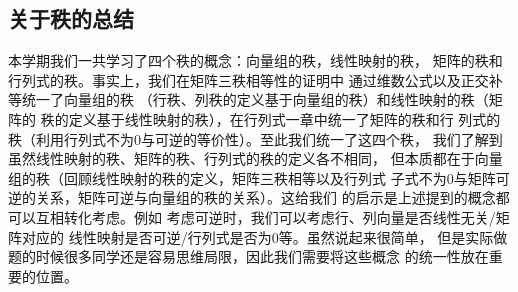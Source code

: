 \subsection{关于秩的总结}
本学期我们一共学习了四个秩的概念：向量组的秩，线性映射的秩，
矩阵的秩和行列式的秩。事实上，我们在矩阵三秩相等性的证明中
通过维数公式以及正交补等统一了向量组的秩
（行秩、列秩的定义基于向量组的秩）和线性映射的秩（矩阵的
秩的定义基于线性映射的秩），在行列式一章中统一了矩阵的秩和行
列式的秩（利用行列式不为0与可逆的等价性）。至此我们统一了这四个秩，
我们了解到虽然线性映射的秩、矩阵的秩、行列式的秩的定义各不相同，
但本质都在于向量组的秩（回顾线性映射的秩的定义，矩阵三秩相等以及行列式
子式不为0与矩阵可逆的关系，矩阵可逆与向量组的秩的关系）。这给我们
的启示是上述提到的概念都可以互相转化考虑。例如
考虑可逆时，我们可以考虑行、列向量是否线性无关/矩阵对应的
线性映射是否可逆/行列式是否为0等。虽然说起来很简单，
但是实际做题的时候很多同学还是容易思维局限，因此我们需要将这些概念
的统一性放在重要的位置。
